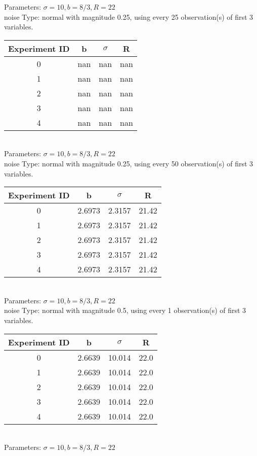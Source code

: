 \begin{multicols}{3}
Parameters: $\sigma=10, b=8/3, R=22$\\
noise Type: normal with magnitude 0.25, using every 25 observation(s) of first 3 variables.\\
\begin{tabular}{cccc}
\hline Experiment ID & b & $\sigma$ & R \\ \hline 
0 & nan & nan & nan\\ \hline 
 1 & nan & nan & nan\\ \hline 
 2 & nan & nan & nan\\ \hline 
 3 & nan & nan & nan\\ \hline 
 4 & nan & nan & nan\\ \hline 
 \end{tabular}\\
Parameters: $\sigma=10, b=8/3, R=22$\\
noise Type: normal with magnitude 0.25, using every 50 observation(s) of first 3 variables.\\
\begin{tabular}{cccc}
\hline Experiment ID & b & $\sigma$ & R \\ \hline 
0 & 2.6973 & 2.3157 & 21.42\\ \hline 
 1 & 2.6973 & 2.3157 & 21.42\\ \hline 
 2 & 2.6973 & 2.3157 & 21.42\\ \hline 
 3 & 2.6973 & 2.3157 & 21.42\\ \hline 
 4 & 2.6973 & 2.3157 & 21.42\\ \hline 
 \end{tabular}\\
Parameters: $\sigma=10, b=8/3, R=22$\\
noise Type: normal with magnitude 0.5, using every 1 observation(s) of first 3 variables.\\
\begin{tabular}{cccc}
\hline Experiment ID & b & $\sigma$ & R \\ \hline 
0 & 2.6639 & 10.014 & 22.0\\ \hline 
 1 & 2.6639 & 10.014 & 22.0\\ \hline 
 2 & 2.6639 & 10.014 & 22.0\\ \hline 
 3 & 2.6639 & 10.014 & 22.0\\ \hline 
 4 & 2.6639 & 10.014 & 22.0\\ \hline 
 \end{tabular}\\
Parameters: $\sigma=10, b=8/3, R=22$\\

\end{multicols}
